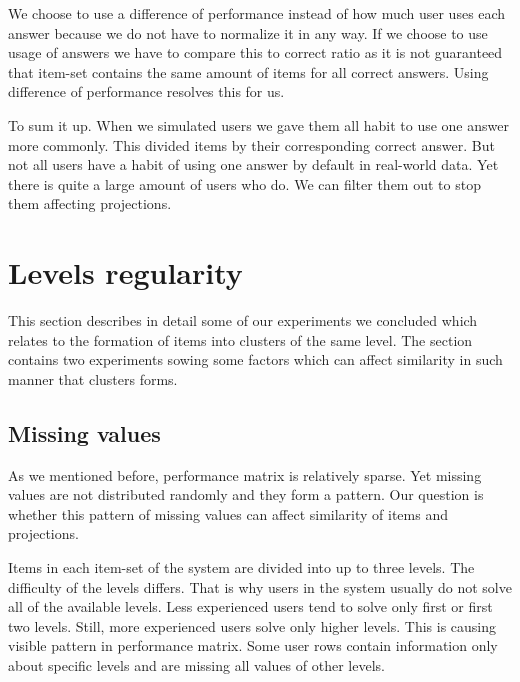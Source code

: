 \documentclass[
  digital, %
  table,   %
  nolof,     %
  nolot,     %
  nocover,
  color,
  final, %
]{fithesis3}
\begin{document}
We choose to use a difference of performance instead of how much user uses each answer because we do not have to normalize it in any way. If we choose to use usage of answers we have to compare this to correct ratio as it is not guaranteed that item-set contains the same amount of items for all correct answers. Using difference of performance resolves this for us.


To sum it up. When we simulated users we gave them all habit to use one answer more commonly. This divided items by their corresponding correct answer. But not all users have a habit of using one answer by default in real-world data. Yet there is quite a large amount of users who do. We can filter them out to stop them affecting projections.


\section{Levels regularity}\label{evaulation-levels-regularity}

This section describes in detail some of our experiments we concluded which relates to the formation of items into clusters of the same level. The section contains two experiments sowing some factors which can affect similarity in such manner that clusters forms.


\subsection{Missing values}\label{missing-values}


As we mentioned before, performance matrix is relatively sparse. Yet missing values are not distributed randomly and they form a pattern. Our question is whether this pattern of missing values can affect similarity of items and projections.


Items in each item-set of the system are divided into up to three levels. The difficulty of the levels differs. That is why users in the system usually do not solve all of the available levels. Less experienced users tend to solve only first or first two levels. Still, more experienced users solve only higher levels. This is causing visible pattern in performance matrix. Some user rows contain information only about specific levels and are missing all values of other levels.
\end{document}
